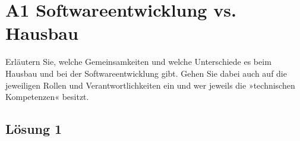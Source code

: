 \documentclass[main.tex]{subfiles}
\begin{document}
\section{A1 Softwareentwicklung vs. Hausbau}
Erläutern Sie, welche Gemeinsamkeiten und welche Unterschiede es beim Hausbau und bei der
Softwareentwicklung gibt. Gehen Sie dabei auch auf die jeweiligen Rollen und Verantwortlichkeiten ein und wer jeweils die »technischen Kompetenzen« besitzt.

\subsection{Lösung 1}
\end{document}

